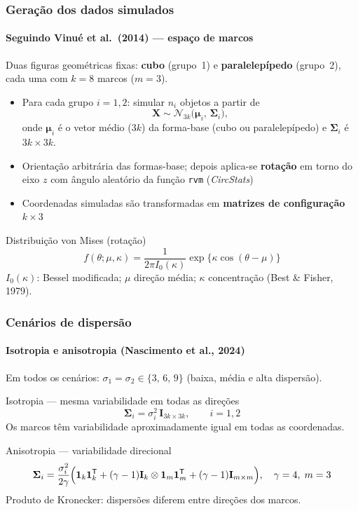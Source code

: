 \documentclass[brazilian,11pt]{beamer}
\begin{document}
\begin{frame}[shrink=10]
    \frametitle{Geração dos dados simulados}
    \framesubtitle{Seguindo Vinué et al.\ (2014) --- espaço de marcos}

    \small
    Duas figuras geométricas fixas: \textbf{cubo} (grupo~1) e \textbf{paralelepípedo} (grupo~2), cada uma com $k=8$ marcos ($m=3$).

    \begin{itemize}
        \item Para cada grupo $i=1,2$: simular $n_i$ objetos a partir de
        \[
            \mathbf{X} \sim \mathcal{N}_{3k}\bigl(\boldsymbol{\mu}_i,\, \boldsymbol{\Sigma}_i\bigr),
        \]
        onde $\boldsymbol{\mu}_i$ é o vetor médio ($3k$) da forma-base (cubo ou paralelepípedo) e $\boldsymbol{\Sigma}_i$ é $3k \times 3k$.
        \item Orientação arbitrária das formas-base; depois aplica-se \textbf{rotação} em torno do eixo $z$ com ângulo aleatório da função \texttt{rvm} (\textit{CircStats})
        \item Coordenadas simuladas são transformadas em \textbf{matrizes de configuração} $k \times 3$
    \end{itemize}

    \begin{block}{Distribuição von Mises (rotação)}
        \[
            f(\theta;\mu,\kappa) = \frac{1}{2\pi I_0(\kappa)} \exp\{\kappa\cos(\theta-\mu)\}
        \]
        $I_0(\kappa)$: Bessel modificada; $\mu$ direção média; $\kappa$ concentração (Best \& Fisher, 1979).
    \end{block}
\end{frame}

\begin{frame}[shrink=12]
    \frametitle{Cenários de dispersão}
    \framesubtitle{Isotropia e anisotropia (Nascimento et al., 2024)}

    \small
    Em todos os cenários: $\sigma_1=\sigma_2 \in \{3,\,6,\,9\}$ (baixa, média e alta dispersão).

    \begin{block}{Isotropia --- mesma variabilidade em todas as direções}
        \[
            \boldsymbol{\Sigma}_i = \sigma_i^2 \, \mathbf{I}_{3k \times 3k}, \qquad i=1,2
        \]
        Os marcos têm variabilidade aproximadamente igual em todas as coordenadas.
    \end{block}

    \begin{block}{Anisotropia --- variabilidade direcional}
        \[
            \boldsymbol{\Sigma}_i = \frac{\sigma_i^2}{2\gamma}\Bigl(
            \mathbf{1}_k\mathbf{1}_k^{\mathsf T}
            + (\gamma-1)\mathbf{I}_k \otimes \mathbf{1}_m\mathbf{1}_m^{\mathsf T}
            + (\gamma-1)\mathbf{I}_{m \times m}\Bigr), \quad \gamma = 4,\; m=3
        \]
        Produto de Kronecker: dispersões diferem entre direções dos marcos.
    \end{block}
\end{frame}
\end{document}
